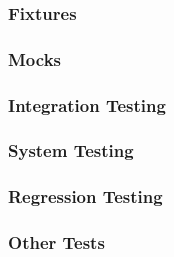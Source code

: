 \begin{frame}
  \frametitle{Fixtures}
\end{frame}

\begin{frame}
  \frametitle{Mocks}
\end{frame}

\begin{frame}
  \frametitle{Integration Testing}
\end{frame}

\begin{frame}
  \frametitle{System Testing}
\end{frame}

\begin{frame}
  \frametitle{Regression Testing}
\end{frame}

\begin{frame}
  \frametitle{Other Tests}
\end{frame}
